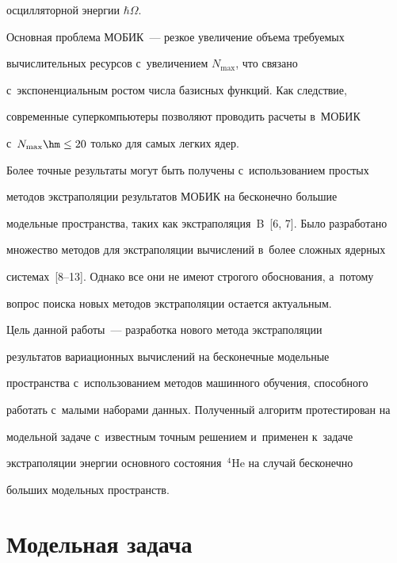 осцилляторной энергии $\hbar \Omega$.


  


  


  Основная проблема \mbox{МОБИК}~--- резкое увеличение объема тре\-бу\-емых 


вы\-чис\-ли\-тель\-ных ресурсов с~увеличением $N_{\max}$, что связано 


с~экспоненциальным рос\-том чис\-ла базисных функций. Как следствие, 


современные суперкомпьютеры поз\-во\-ля\-ют проводить рас\-че\-ты в~\mbox{МОБИК} 


с~$N_{\max}\hm\leq 20$ только для самых лег\-ких ядер. 


  


  Более точные результаты могут быть получены с~использованием прос\-тых 


методов экстраполяции результатов \mbox{МОБИК} на бесконечно большие 


модельные пространства, таких как экстраполяция~B~[6, 7]. Было разработано 


множество методов для экстраполяции вы\-чис\-ле\-ний в~более слож\-ных ядерных 


сис\-те\-мах~[8--13]. Однако все они не имеют строгого обоснования, а~потому 


вопрос поиска новых методов экстраполяции остается актуальным.


  


  Цель данной работы~--- разработка нового метода экстраполяции 


результатов вариационных вы\-чис\-ле\-ний на бесконечные модельные 


пространства с~использованием методов машинного обуче\-ния, способного 


работать с~малыми наборами данных. Полученный алгоритм протестирован на 


модельной задаче с~известным точ\-ным решением и~применен к~задаче 


экстраполяции энергии основного со\-сто\-яния~${}^4$He на случай бесконечно 


больших модельных пространств.


  


\section{Модельная задача}





